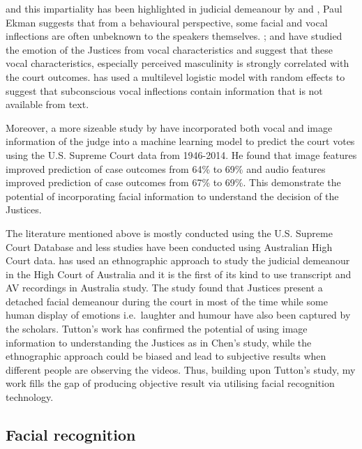 \documentclass{monashthesis}
\begin{document}
and this impartiality has been highlighted in judicial demeanour by \textcite{tutton2018judicial} and \textcite{goffman1956nature}, Paul Ekman \textcite{ekman1991invited} suggests that from a behavioural perspective, some facial and vocal inflections are often unbeknown to the speakers themselves. \textcite{chen2016perceived}; \textcite{chen2017covering} and \textcite{schubert1992observing} have studied the emotion of the Justices from vocal characteristics and suggest that these vocal characteristics, especially perceived masculinity is strongly correlated with the court outcomes. \textcite{dietrich2019emotional} has used a multilevel logistic model with random effects to suggest that subconscious vocal inflections contain information that is not available from text.

Moreover, a more sizeable study by \textcite{chen2018justice} have incorporated both vocal and image information of the judge into a machine learning model to predict the court votes using the U.S. Supreme Court data from 1946-2014. He found that image features improved prediction of case outcomes from 64\% to 69\% and audio features improved prediction of case outcomes from 67\% to 69\%. This demonstrate the potential of incorporating facial information to understand the decision of the Justices.

The literature mentioned above is mostly conducted using the U.S. Supreme Court Database and less studies have been conducted using Australian High Court data. \textcite{tutton2018judicial} has used an ethnographic approach to study the judicial demeanour in the High Court of Australia and it is the first of its kind to use transcript and AV recordings in Australia study. The study found that Justices present a detached facial demeanour during the court in most of the time while some human display of emotions i.e.~laughter and humour have also been captured by the scholars. Tutton's work has confirmed the potential of using image information to understanding the Justices as in Chen's study, while the ethnographic approach could be biased and lead to subjective results when different people are observing the videos. Thus, building upon Tutton's study, my work fills the gap of producing objective result via utilising facial recognition technology.

\hypertarget{facial-recognition}{%
\subsection{Facial recognition}\label{facial-recognition}}
\end{document}
